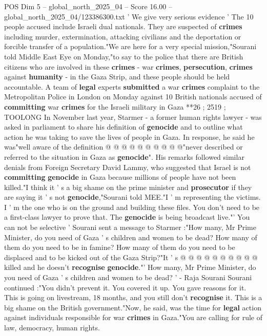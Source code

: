\begin{textsample}{POS Dim 5 – global\_north\_2025\_04 – Score 16.00 – global\_north\_2025\_04/123386300.txt}  \label{ex:f5_pos_110}
' We give very serious evidence ' The 10 people accused include Israeli dual nationals.
They are suspected of \textbf{crimes} including murder, extermination, attacking civilians and the deportation or forcible transfer of a population."We are here for a very special mission,"Sourani told Middle East Eye on Monday,"to say to the police that there are British citizens who are involved in these \textbf{crimes} - war \textbf{crimes}, \textbf{persecution}, \textbf{crimes} against \textbf{humanity} - in the Gaza Strip, and these people should be held accountable.
A team of \textbf{legal} experts \textbf{submitted} a war \textbf{crimes} complaint to the Metropolitan Police in London on Monday against 10 British nationals accused of \textbf{committing} war \textbf{crimes} for the Israeli military in Gaza **26 ; 2519 ; TOOLONG In November last year, Starmer - a former human rights lawyer - was asked in parliament to share his definition of \textbf{genocide} and to outline what action he was taking to save the lives of people in Gaza.
In response, he said he was"well aware of the definition @ @ @ @ @ @ @ @ @ @"never described or referred to the situation in Gaza as \textbf{genocide}".
His remarks followed similar denials from Foreign Secretary David Lammy, who suggested that Israel is not \textbf{committing} \textbf{genocide} in Gaza because millions of people have not been killed."I think it ' s a big shame on the prime minister and \textbf{prosecutor} if they are saying it ' s not \textbf{genocide},"Sourani told MEE."I ' m representing the victims.
I ' m the one who is on the ground and building these files.
You don't need to be a first-class lawyer to prove that.
The \textbf{genocide} is being broadcast live."' You can not be selective ' Sourani sent a message to Starmer :"How many, Mr Prime Minister, do you need of Gaza ' s children and women to be dead?
How many of them do you need to be in famine?
How many of them do you need to be displaced and to be kicked out of the Gaza Strip?"It ' s @ @ @ @ @ @ @ @ @ @ killed and he doesn't \textbf{recognise} \textbf{genocide}."' How many, Mr Prime Minister, do you need of Gaza ' s children and women to be dead? ' - Raja Sourani Sourani continued :"You didn't prevent it.
You covered it up.
You gave reasons for it.
This is going on livestream, 18 months, and you still don't \textbf{recognise} it.
This is a big shame on the British government."Now, he said, was the time for \textbf{legal} action against individuals responsible for war \textbf{crimes} in Gaza."You are calling for rule of law, democracy, human rights.

\end{textsample}
